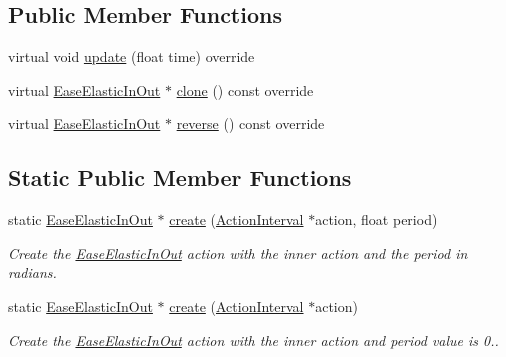 \subsection*{Public Member Functions}
\begin{DoxyCompactItemize}
\item 
virtual void \hyperlink{classEaseElasticInOut_adb67d3b3eec6b3b8fd2b7a22ed72c4f8}{update} (float time) override
\item 
virtual \hyperlink{classEaseElasticInOut}{Ease\+Elastic\+In\+Out} $\ast$ \hyperlink{classEaseElasticInOut_a3b008e59719729110c7965170788c0b4}{clone} () const override
\item 
virtual \hyperlink{classEaseElasticInOut}{Ease\+Elastic\+In\+Out} $\ast$ \hyperlink{classEaseElasticInOut_a08123565179ad98702f27561605dabae}{reverse} () const override
\end{DoxyCompactItemize}
\subsection*{Static Public Member Functions}
\begin{DoxyCompactItemize}
\item 
static \hyperlink{classEaseElasticInOut}{Ease\+Elastic\+In\+Out} $\ast$ \hyperlink{classEaseElasticInOut_a34e674d457e0748e1fe90b88e85f9b9e}{create} (\hyperlink{classActionInterval}{Action\+Interval} $\ast$action, float period)
\begin{DoxyCompactList}\small\item\em Create the \hyperlink{classEaseElasticInOut}{Ease\+Elastic\+In\+Out} action with the inner action and the period in radians. \end{DoxyCompactList}\item 
static \hyperlink{classEaseElasticInOut}{Ease\+Elastic\+In\+Out} $\ast$ \hyperlink{classEaseElasticInOut_a39c8a2dae55eecb28dcf0cd1b2fb7918}{create} (\hyperlink{classActionInterval}{Action\+Interval} $\ast$action)
\begin{DoxyCompactList}\small\item\em Create the \hyperlink{classEaseElasticInOut}{Ease\+Elastic\+In\+Out} action with the inner action and period value is 0.. \end{DoxyCompactList}\end{DoxyCompactItemize}
